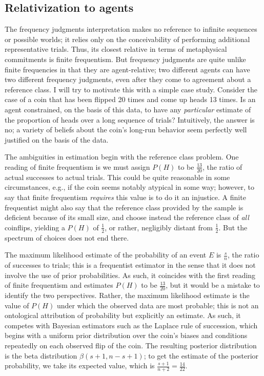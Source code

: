 \documentclass[letterpaper,12pt]{article}
\begin{document}
\subsection{Relativization to agents}
The frequency judgments interpretation makes no reference to infinite sequences or possible worlds; it relies only on the conceivability of performing additional representative trials. Thus, its closest relative in terms of metaphysical commitments is finite frequentism. But frequency judgments are quite unlike finite frequencies in that they are agent-relative; two different agents can have two different frequency judgments, even after they come to agreement about a reference class. I will try to motivate this with a simple case study. Consider the case of a coin that has been flipped 20 times and come up heads 13 times. Is an agent constrained, on the basis of this data, to have any \emph{particular} estimate of the proportion of heads over a long sequence of trials? Intuitively, the answer is no; a variety of beliefs about the coin's long-run behavior seem perfectly well justified on the basis of the data.

The ambiguities in estimation begin with the reference class problem. One reading of finite frequentism is we must assign $P(H)$ to be $\frac{13}{20}$, the ratio of actual successes to actual trials. This could be quite reasonable in some circumstances, e.g., if the coin seems notably atypical in some way; however, to say that finite frequentism \emph{requires} this value is to do it an injustice. A finite frequentist might also say that the reference class provided by the sample is deficient because of its small size, and choose instead the reference class of \emph{all} coinflips, yielding a $P(H)$ of $\frac{1}{2}$, or rather, negligibly distant from $\frac{1}{2}$. But the spectrum of choices does not end there.

The maximum likelihood estimate of the probability of an event $E$ is $\frac{s}{n}$, the ratio of successes to trials; this is a frequentist estimator in the sense that it does not involve the use of prior probabilities. As such, it coincides with the first reading of finite frequentism and estimates $P(H)$ to be $\frac{13}{20}$, but it would be a mistake to identify the two perspectives. Rather, the maximum likelihood estimate is the value of $P(H)$ under which the observed data are most probable; this is not an ontological attribution of probability but explicitly an estimate. As such, it competes with Bayesian estimators such as the Laplace rule of succession, which begins with a uniform prior distribution over the coin's biases and conditions repeatedly on each observed flip of the coin. The resulting posterior distribution is the beta distribution $\beta(s+1, n-s+1)$; to get the estimate of the posterior probability, we take its expected value, which is $\frac{s+1}{n+2} = \frac{14}{22}$.
\end{document}
